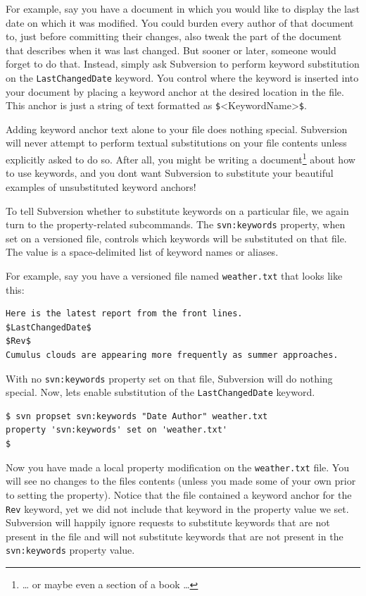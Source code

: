 For example, say you have a document in which you would like to display
the last date on which it was modified. You could burden every author of
that document to, just before committing their changes, also tweak the
part of the document that describes when it was last changed. But sooner
or later, someone would forget to do that. Instead, simply ask
Subversion to perform keyword substitution on the
\texttt{LastChangedDate} keyword. You control where the keyword is
inserted into your document by placing a keyword anchor at the desired
location in the file. This anchor is just a string of text formatted as
\texttt{\$}\textless KeywordName\textgreater{}\texttt{\$}.

Adding keyword anchor text alone to your file does nothing special.
Subversion will never attempt to perform textual substitutions on your
file contents unless explicitly asked to do so. After all, you might be
writing a document\footnote{\ldots{} or maybe even a section of a book
  \ldots{}} about how to use keywords, and you don\textquotesingle t
want Subversion to substitute your beautiful examples of unsubstituted
keyword anchors!

To tell Subversion whether to substitute keywords on a particular file,
we again turn to the property-related subcommands. The
\texttt{svn:keywords} property, when set on a versioned file, controls
which keywords will be substituted on that file. The value is a
space-delimited list of keyword names or aliases.

For example, say you have a versioned file named \texttt{weather.txt}
that looks like this:

\begin{verbatim}
Here is the latest report from the front lines.
$LastChangedDate$
$Rev$
Cumulus clouds are appearing more frequently as summer approaches.
\end{verbatim}

With no \texttt{svn:keywords} property set on that file, Subversion will
do nothing special. Now, let\textquotesingle s enable substitution of
the \texttt{LastChangedDate} keyword.

\begin{verbatim}
$ svn propset svn:keywords "Date Author" weather.txt
property 'svn:keywords' set on 'weather.txt'
$
\end{verbatim}

Now you have made a local property modification on the
\texttt{weather.txt} file. You will see no changes to the
file\textquotesingle s contents (unless you made some of your own prior
to setting the property). Notice that the file contained a keyword
anchor for the \texttt{Rev} keyword, yet we did not include that keyword
in the property value we set. Subversion will happily ignore requests to
substitute keywords that are not present in the file and will not
substitute keywords that are not present in the \texttt{svn:keywords}
property value.

